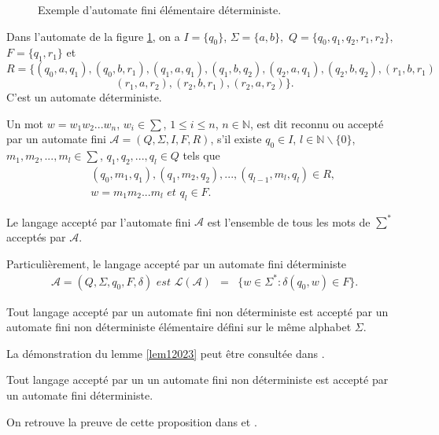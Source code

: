 \begin{Rem}
\begin{Ex}
\begin{figure}[!htb]
\begin{minipage}[c]{.96\linewidth}
\caption{\label{Figau1} Exemple d'automate fini élémentaire déterministe.}
\end{minipage}
\end{figure}
Dans l'automate de la figure \ref{Figau1}, on a  $I=\{q_{0}\}$,  $\Sigma = \{a,b\},$ $Q=\{q_{0}, q_{1}, q_{2}, r_{1}, r_{2}\},$  $F= \{q_{1}, r_{1}\}$ et 
$$R=\{ (q_{0},a,q_{1}), (q_{0},b,r_{1}), (q_{1},a,q_{1}), (q_{1},b,q_{2}), (q_{2},a,q_{1}), (q_{2},b,q_{2}),(r_{1},b,r_{1})$$
$$(r_{1},a,r_{2}), (r_{2},b,r_{1}), (r_{2},a,r_{2})\}.$$ C'est un automate déterministe.
\end{Ex}
Un mot $w=w_{1}w_{2}...w_{n}$, $w_{i}\in \sum$, $1\leq i \leq n$, $n\in \mathbb{N}$, est dit reconnu ou accepté par un automate fini $\mathcal{A}= \left(Q,\Sigma,I,F,R\right)$, s'il existe $q_{0}\in I$, $l\in \mathbb{N}\backslash \{0\}$, $m_{1},m_{2},...,m_{l}\in \sum$, $q_{1},q_{2},...,q_{l}\in Q$ 
tels que 
\begin{eqnarray}
& &(q_{0},m_{1},q_{1}), (q_{1},m_{2},q_{2}),...,(q_{l-1},m_{l},q_{l})\in R,\\\nonumber
& & w=m_{1}m_{2}...m_{l} \textit{ et } q_{l}\in F.
\end{eqnarray}

Le langage accepté par l'automate fini $\mathcal{A}$ est l'ensemble de tous les mots de $\sum^{*}$ acceptés par $\mathcal{A}$.

Particulièrement, le langage accepté par un automate fini déterministe 
\begin{eqnarray*}
\mathcal{A}= (Q,\Sigma,q_{0},F,\delta) \textit{ est }\mathcal{L}(\mathcal{A}) &= & \{w\in \Sigma^{*} : \delta(q_{0},w)\in F\}.
\end{eqnarray*}
\end{Rem}

\begin{Lem}\label{lem12023}
Tout langage accepté par un automate fini non déterministe est accepté par un automate fini non déterministe élémentaire défini sur le même alphabet $\Sigma$. 
\end{Lem}
La démonstration du lemme \ref{lem12023} peut être consultée dans  \cite{RaSc}.
\begin{Prop}\label{prop232023}
Tout langage accepté par un un automate fini non déterministe 
est accepté par un automate fini déterministe.
\end{Prop}
On retrouve la preuve de cette proposition dans \cite{Auto1} et  \cite{RaSc}.

